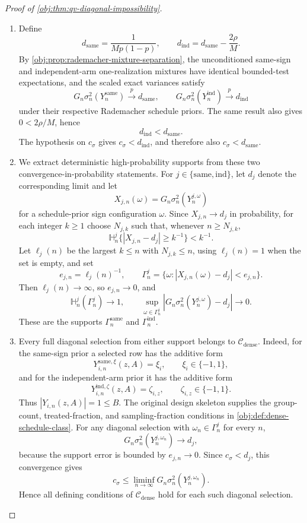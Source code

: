 \documentclass[11pt]{article}
\begin{document}
\begin{proof}[Proof of \cref{obj:thm:qv-diagonal-impossibility}]
\begin{enumerate}
\item Define
\[
d_{\mathrm{same}}=\frac{1}{M p(1-p)},
\qquad
d_{\mathrm{ind}}=d_{\mathrm{same}}-\frac{2\rho}{M}.
\]
By \cref{obj:prop:rademacher-mixture-separation}, the unconditioned same-sign and independent-arm one-realization mixtures have identical bounded-test expectations, and the scaled exact variances satisfy
\[
G_n\sigma_n^2(Y_n^{\mathrm{same}})\xrightarrow{p}d_{\mathrm{same}},
\qquad
G_n\sigma_n^2(Y_n^{\mathrm{ind}})\xrightarrow{p}d_{\mathrm{ind}}
\]
under their respective Rademacher schedule priors. The same result also gives \(0<2\rho/M\), hence
\[
d_{\mathrm{ind}}<d_{\mathrm{same}}.
\]
The hypothesis on \(c_\sigma\) gives \(c_\sigma<d_{\mathrm{ind}}\), and therefore also \(c_\sigma<d_{\mathrm{same}}\). %

\item We extract deterministic high-probability supports from these two convergence-in-probability statements. For \(j\in\{\mathrm{same},\mathrm{ind}\}\), let \(d_j\) denote the corresponding limit and let
\[
X_{j,n}(\omega)=G_n\sigma_n^2(Y_n^{j,\omega})
\]
for a schedule-prior sign configuration \(\omega\). Since \(X_{j,n}\to d_j\) in probability, for each integer \(k\ge1\) choose \(N_{j,k}\) such that, whenever \(n\ge N_{j,k}\),
\[
\mathbb H_n^j\{|X_{j,n}-d_j|\ge k^{-1}\}<k^{-1}.
\]
Let \(\ell_j(n)\) be the largest \(k\le n\) with \(N_{j,k}\le n\), using \(\ell_j(n)=1\) when the set is empty, and set
\[
e_{j,n}=\ell_j(n)^{-1},
\qquad
\Gamma_n^j=\{\omega: |X_{j,n}(\omega)-d_j|<e_{j,n}\}.
\]
Then \(\ell_j(n)\to\infty\), so \(e_{j,n}\to0\), and
\[
\mathbb H_n^j(\Gamma_n^j)\to1,
\qquad
\sup_{\omega\in\Gamma_n^j}|G_n\sigma_n^2(Y_n^{j,\omega})-d_j|\to0 .
\]
These are the supports \(\Gamma_n^{\mathrm{same}}\) and \(\Gamma_n^{\mathrm{ind}}\). %

\item Every full diagonal selection from either support belongs to \(\mathcal C_{\mathrm{dense}}\). Indeed, for the same-sign prior a selected row has the additive form
\[
Y_{i,n}^{\mathrm{same},\xi}(z,A)=\xi_i,\qquad \xi_i\in\{-1,1\},
\]
and for the independent-arm prior it has the additive form
\[
Y_{i,n}^{\mathrm{ind},\zeta}(z,A)=\zeta_{i,z},\qquad \zeta_{i,z}\in\{-1,1\}.
\]
Thus \(|Y_{i,n}(z,A)|=1\le B\). The original design skeleton supplies the group-count, treated-fraction, and sampling-fraction conditions in \cref{obj:def:dense-schedule-class}. For any diagonal selection with \(\omega_n\in\Gamma_n^j\) for every \(n\),
\[
G_n\sigma_n^2(Y_n^{j,\omega_n})\to d_j,
\]
because the support error is bounded by \(e_{j,n}\to0\). Since \(c_\sigma<d_j\), this convergence gives
\[
c_\sigma\le \liminf_{n\to\infty}G_n\sigma_n^2(Y_n^{j,\omega_n}).
\]
Hence all defining conditions of \(\mathcal C_{\mathrm{dense}}\) hold for each such diagonal selection. %


\end{enumerate}
\end{proof}
\end{document}
